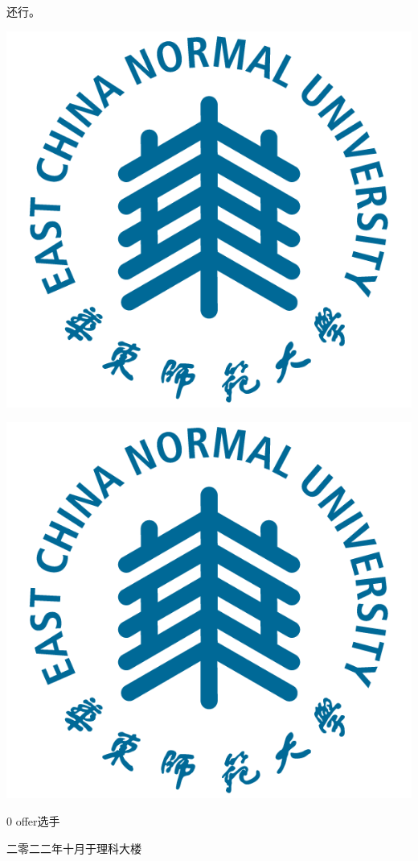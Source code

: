 \newpage
{\kaishu
  \begin{center}
    \LARGE\bfseries{}
  \end{center}

    还行。

  \centering
  \includegraphics[scale=0.10]{fig/ecnu_logo.png}
  
  \centering
  \includegraphics[scale=0.10]{fig/ecnu_logo.png}

  \vspace{1cm} \hspace{9.8cm}  0 offer选手

  \hspace{8cm}
} 二零二二年十月于理科大楼
